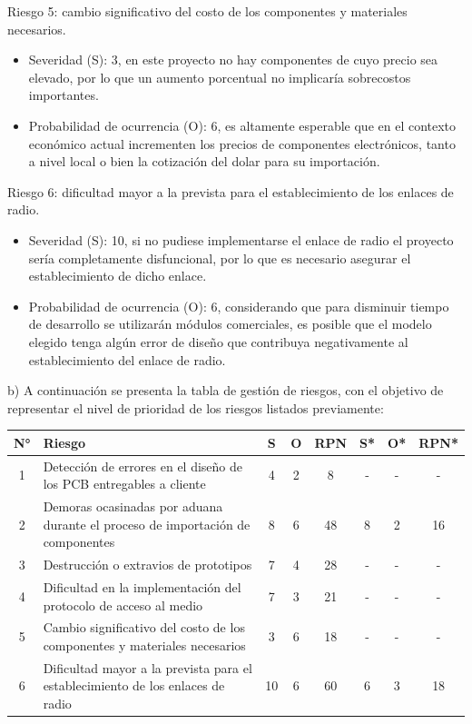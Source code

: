 \documentclass[
11pt, %
codirector, %
]{charter}
\begin{document}
Riesgo 5: cambio significativo del costo de los componentes y materiales necesarios.
\begin{itemize}
	\item Severidad (S): 3, en este proyecto no hay componentes de cuyo precio sea elevado, por lo que un aumento porcentual no implicaría sobrecostos importantes.
	\item Probabilidad de ocurrencia (O): 6, es altamente esperable que en el contexto económico actual incrementen los precios de componentes electrónicos, tanto a nivel local o bien la cotización del dolar para su importación. 
\end{itemize}

Riesgo 6: dificultad mayor a la prevista para el establecimiento de los enlaces de radio.
\begin{itemize}
	\item Severidad (S): 10, si no pudiese implementarse el enlace de radio el proyecto sería completamente disfuncional, por lo que es necesario asegurar el establecimiento de dicho enlace.
	\item Probabilidad de ocurrencia (O): 6, considerando que para disminuir tiempo de desarrollo se utilizarán módulos comerciales, es posible que el modelo elegido tenga algún error de diseño que contribuya negativamente al establecimiento del enlace de radio.
\end{itemize}


b) A continuación se presenta la tabla de gestión de riesgos, con el objetivo de representar el nivel de prioridad de los riesgos listados previamente:

\begin{table}[htpb]
\centering
\begin{tabularx}{\linewidth}{@{}|c|X|c|c|c|c|c|c|@{}}
\hline
\rowcolor[HTML]{C0C0C0} 
N° & Riesgo & S & O & RPN & S* & O* & RPN* \\ \hline
1  & Detección de errores en el diseño de los PCB entregables a cliente
& 4   & 2   & 8     & -    & -    & -      \\ \hline

2  & Demoras ocasinadas por aduana durante el proceso de importación de componentes
& 8   & 6   & 48     & 8    & 2    & 16      \\ \hline

3  & Destrucción o extravios de prototipos
& 7   & 4   & 28     & -    & -    & -      \\ \hline

4  & Dificultad en la implementación del protocolo de acceso al medio
& 7   & 3   & 21     & -   & -   & -     \\ \hline

5  & Cambio significativo del costo de los componentes y materiales necesarios
& 3   & 6   & 18     & -    & -    & -      \\ \hline

6  & Dificultad mayor a la prevista para el establecimiento de los enlaces de radio
& 10   & 6   & 60     & 6    & 3    & 18      \\ \hline
\end{tabularx}%
\end{table}
\end{document}
